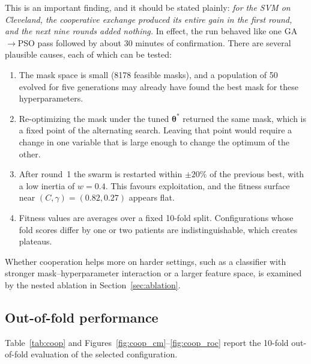 \documentclass[MTech]{ugthesis}
\begin{document}
This is an important finding, and it should be stated plainly: \emph{for the SVM on Cleveland, the cooperative exchange produced its entire gain in the first round, and the next nine rounds added nothing.} In effect, the run behaved like one GA$\rightarrow$PSO pass followed by about 30 minutes of confirmation. There are several plausible causes, each of which can be tested:
\begin{enumerate}
\item The mask space is small (8178 feasible masks), and a population of 50 evolved for five generations may already have found the best mask for these hyperparameters.
\item Re-optimizing the mask under the tuned $\boldsymbol{\theta}^{*}$ returned the same mask, which is a fixed point of the alternating search. Leaving that point would require a change in one variable that is large enough to change the optimum of the other.
\item After round~1 the swarm is restarted within $\pm20\%$ of the previous best, with a low inertia of $w=0.4$. This favours exploitation, and the fitness surface near $(C,\gamma)=(0.82,0.27)$ appears flat.
\item Fitness values are averages over a fixed 10-fold split. Configurations whose fold scores differ by one or two patients are indistinguishable, which creates plateaus.
\end{enumerate}
Whether cooperation helps more on harder settings, such as a classifier with stronger mask--hyperparameter interaction or a larger feature space, is examined by the nested ablation in Section~\ref{sec:ablation}.

\subsection{Out-of-fold performance}
Table~\ref{tab:coop} and Figures~\ref{fig:coop_cm}--\ref{fig:coop_roc} report the 10-fold out-of-fold evaluation of the selected configuration.
\end{document}
